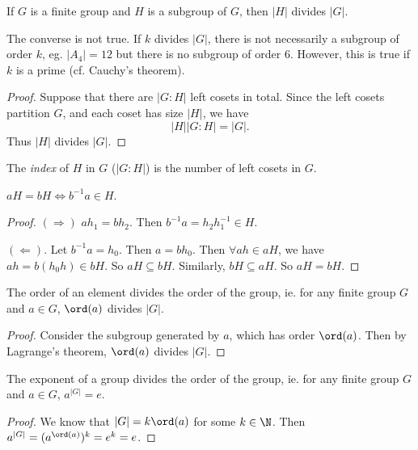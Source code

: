 \documentclass[a4paper]{article}
\begin{document}
\begin{thm}
  If $G$ is a finite group and $H$ is a subgroup of $G$, then $|H|$ divides $|G|$.
\end{thm}
\note The converse is not true. If $k$ divides $|G|$, there is not necessarily a subgroup of order $k$, eg. $|A_4| = 12$ but there is no subgroup of order $6$. However, this is true if $k$ is a prime (cf. Cauchy's theorem).

\begin{proof}
  Suppose that there are $|G: H|$ left cosets in total. Since the left cosets partition $G$, and each coset has size $|H|$, we have
  \[
    |H||G:H| = |G|.
  \]
  Thus $|H|$ divides $|G|$.
\end{proof}

\begin{defi}
  The \emph{index} of $H$ in $G$ ($|G:H|$) is the number of left cosets in $G$.
\end{defi}

\begin{prop}
  $aH = bH \Leftrightarrow b^{-1}a\in H$.
\end{prop}
\begin{proof}
  $(\Rightarrow)$ $ah_1 = bh_2$. Then $b^{-1}a = h_2h_1^{-1}\in H$.

  $(\Leftarrow)$. Let $b^{-1}a = h_0$. Then $a = bh_0$. Then $\forall ah\in aH$, we have $ah = b(h_0h)\in bH$. So $aH \subseteq bH$. Similarly, $bH\subseteq aH$. So $aH = bH$.
\end{proof}

\begin{cor}
  The order of an element divides the order of the group, ie. for any finite group $G$ and $a\in G$, $\ord(a)$ divides $|G|$.
\end{cor}
\begin{proof}
  Consider the subgroup generated by $a$, which has order $\ord(a)$. Then by Lagrange's theorem, $\ord(a)$ divides $|G|$.
\end{proof}

\begin{cor}
  The exponent of a group divides the order of the group, ie. for any finite group $G$ and $a\in G$, $a^{|G|} = e$.
\end{cor}

\begin{proof}
  We know that $|G| = k\ord(a)$ for some $k\in \N$. Then $a^{|G|} = (a^{\ord(a)})^k = e^k = e$.
\end{proof}
\end{document}
